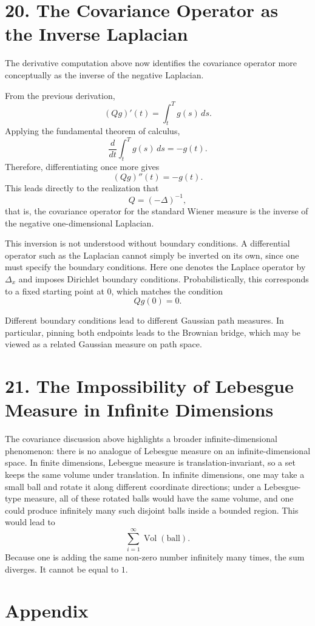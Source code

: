 \documentclass[11pt]{article}
\theoremstyle{definition}
\theoremstyle{remark}
\begin{document}
\section*{20. The Covariance Operator as the Inverse Laplacian}
The derivative computation above now identifies the covariance operator more conceptually as the inverse of the negative Laplacian.

From the previous derivation,
\[
(Qg)'(t)=\int_t^T g(s)\,ds.
\]
Applying the fundamental theorem of calculus,
\[
\frac{d}{dt}\int_t^T g(s)\,ds=-g(t).
\]
Therefore, differentiating once more gives
\[
(Qg)''(t)=-g(t).
\]
This leads directly to the realization that
\[
Q=(-\Delta)^{-1},
\]
that is, the covariance operator for the standard Wiener measure is the inverse of the negative one-dimensional Laplacian.

This inversion is not understood without boundary conditions. A differential operator such as the Laplacian cannot simply be inverted on its own, since one must specify the boundary conditions. Here one denotes the Laplace operator by $\Delta_x$ and imposes Dirichlet boundary conditions. Probabilistically, this corresponds to a fixed starting point at $0$, which matches the condition
\[
Qg(0)=0.
\]

Different boundary conditions lead to different Gaussian path measures. In particular, pinning both endpoints leads to the Brownian bridge, which may be viewed as a related Gaussian measure on path space.

\section*{21. The Impossibility of Lebesgue Measure in Infinite Dimensions}
The covariance discussion above highlights a broader infinite-dimensional phenomenon: there is no analogue of Lebesgue measure on an infinite-dimensional space. In finite dimensions, Lebesgue measure is translation-invariant, so a set keeps the same volume under translation. In infinite dimensions, one may take a small ball and rotate it along different coordinate directions; under a Lebesgue-type measure, all of these rotated balls would have the same volume, and one could produce infinitely many such disjoint balls inside a bounded region. This would lead to
\[
\sum_{i=1}^{\infty} \operatorname{Vol}(\text{ball}).
\]
Because one is adding the same non-zero number infinitely many times, the sum diverges. It cannot be equal to $1$.

\section*{Appendix}
\end{document}
